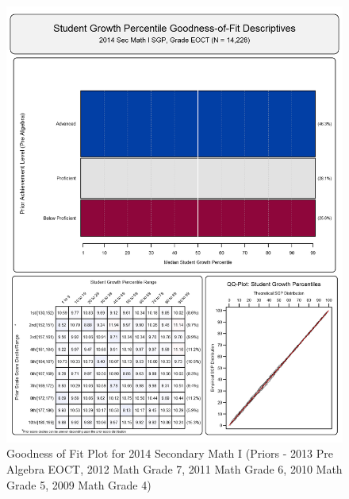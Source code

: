 \documentclass[12pt]{article}
\begin{document}
\begin{figure}[htbp]
\centering
\includegraphics{../img/Goodness_of_Fit/SEC_MATH_I.2014/2014_SEC_MATH_I_EOCT;2013_PRE_ALGEBRA_EOCT;2012_MATH_7;2011_MATH_6;2010_MATH_5;2009_MATH_4.png}
\caption{Goodness of Fit Plot for 2014 Secondary Math I (Priors - 2013
Pre Algebra EOCT, 2012 Math Grade 7, 2011 Math Grade 6, 2010 Math Grade
5, 2009 Math Grade 4)}
\end{figure}
\end{document}
